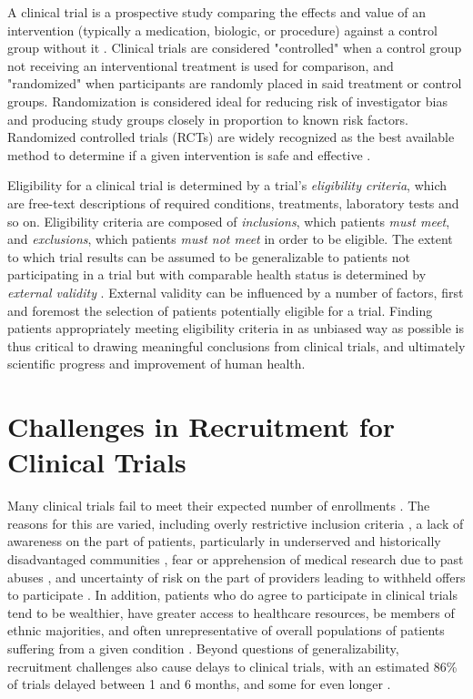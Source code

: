 \documentclass[../main.tex]{subfiles}
\begin{document}
A clinical trial is a prospective study comparing the effects and value of an intervention (typically a medication, biologic, or procedure) against a control group without it \cite{friedman2015fundamentals}. Clinical trials are considered "controlled" when a control group not receiving an interventional treatment is used for comparison, and "randomized" when participants are randomly placed in said treatment or control groups. Randomization is considered ideal for reducing risk of investigator bias and producing study groups closely in proportion to known risk factors. Randomized controlled trials (RCTs) are widely recognized as the best available method to determine if a given intervention is safe and effective \cite{friedman2015fundamentals}.

Eligibility for a clinical trial is determined by a trial's \textit{eligibility criteria}, which are free-text descriptions of required conditions, treatments, laboratory tests and so on. Eligibility criteria are composed of \textit{inclusions}, which patients \textit{must meet}, and \textit{exclusions}, which patients \textit{must not meet} in order to be eligible. The extent to which trial results can be assumed to be generalizable to patients not participating in a trial but with comparable health status is determined by \textit{external validity} \cite{rothwell2005external}. External validity can be influenced by a number of factors, first and foremost the selection of patients potentially eligible for a trial. Finding patients appropriately meeting eligibility criteria in as unbiased way as possible is thus critical to drawing meaningful conclusions from clinical trials, and ultimately scientific progress and improvement of human health.

\section{Challenges in Recruitment for Clinical Trials}

Many clinical trials fail to meet their expected number of enrollments \cite{frank2004current, grill2010addressing, heller2014strategies, nipp2019overcoming}. The reasons for this are varied, including overly restrictive inclusion criteria \cite{grill2010addressing}, a lack of awareness on the part of patients, particularly in underserved and historically disadvantaged communities \cite{heller2014strategies}, fear or apprehension of medical research due to past abuses \cite{frank2004current}, and uncertainty of risk on the part of providers leading to withheld offers to participate \cite{nipp2019overcoming}. In addition, patients who do agree to participate in clinical trials tend to be wealthier, have greater access to healthcare resources, be members of ethnic majorities, and often unrepresentative of overall populations of patients suffering from a given condition \cite{grill2010addressing, heller2014strategies, nipp2019overcoming, guadagnolo2009involving, penberthy2010automated, holmes2012increasing}. Beyond questions of generalizability, recruitment challenges also cause delays to clinical trials, with an estimated 86\% of trials delayed between 1 and 6 months, and some for even longer \cite{sullivan2004subject, thadani2009electronic}.
\end{document}
